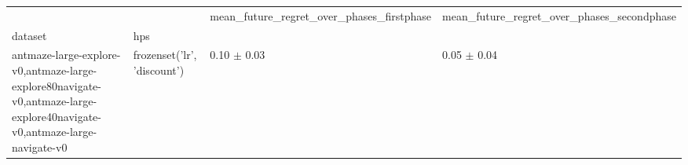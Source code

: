 \begin{tabular}{llll}
\toprule
 &  & mean_future_regret_over_phases_firstphase & mean_future_regret_over_phases_secondphase \\
dataset & hps &  &  \\
\midrule
antmaze-large-explore-v0,antmaze-large-explore80navigate-v0,antmaze-large-explore40navigate-v0,antmaze-large-navigate-v0 & frozenset({'lr', 'discount'}) & 0.10 $\pm$ 0.03 & 0.05 $\pm$ 0.04 \\
\cline{1-4}
\bottomrule
\end{tabular}
